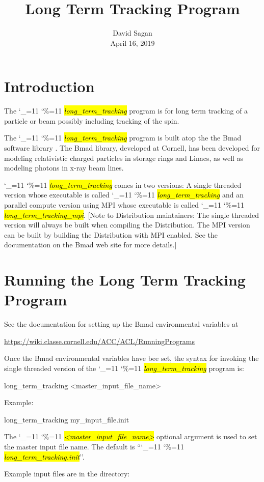 \documentclass{hitec}
\title{Long Term Tracking Program}
\author{}
\date{David Sagan \\ April 16, 2019}
\newcommand\dottcmd[1]{\hl{\em#1}\endgroup}
\newcommand{\vn}{\begingroup\catcode`\_=11 \catcode`\%=11 \dottcmd}
\newcommand{\ltt}{\vn{long_term_tracking}\xspace}
\newcommand{\Section}[1]{\section{#1}\vspace*{-1ex}}
\begin{document}
\maketitle

\tableofcontents


\Section{Introduction} 

The \ltt program is for long term tracking of a particle or beam possibly
including tracking of the spin.

The \ltt program is built atop the the Bmad software library \cite{b:bmad}. The Bmad library,
developed at Cornell, has been developed for modeling relativistic charged particles in storage
rings and Linacs, as well as modeling photons in x-ray beam lines.

\ltt comes in two versions: A single threaded version whose executable is called
\vn{long_term_tracking} and an parallel compute version using MPI whose executable is called
\vn{long_term_tracking_mpi}. [Note to Distribution maintainers: The single threaded version will
always be built when compiling the Distribution. The MPI version can be built by building the
Distribution with MPI enabled. See the documentation on the Bmad web site for more details.]

\Section{Running the Long Term Tracking Program} 
\label{s:run}

See the documentation for setting up the Bmad environmental variables at
\begin{code}
  \url{https://wiki.classe.cornell.edu/ACC/ACL/RunningPrograms}
\end{code}

Once the Bmad environmental variables have bee set, the syntax for invoking the single threaded
version of the \ltt program is:
\begin{code}
  long_term_tracking {<master_input_file_name>}
\end{code}
Example:
\begin{code}
  long_term_tracking my_input_file.init
\end{code}
The \vn{<master_input_file_name>} optional argument is used to set the master input file name. The
default is ``\vn{long_term_tracking.init}''.

Example input files are in the directory:
\end{document}
